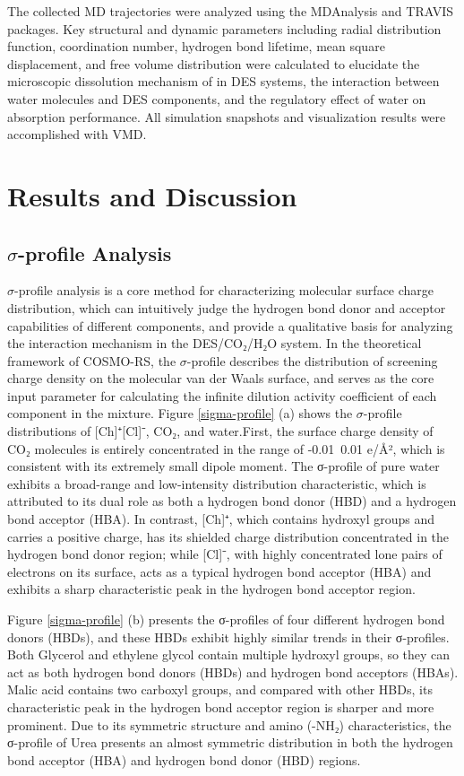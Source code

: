 \documentclass[AMA,LATO2COL]{WileyNJDv5} %
\begin{document}
The collected MD trajectories were analyzed using the MDAnalysis and TRAVIS packages. Key structural and dynamic parameters including radial distribution function, coordination number, hydrogen bond lifetime, mean square displacement, and free volume distribution were calculated to elucidate the microscopic dissolution mechanism of  in DES systems, the interaction between water molecules and DES components, and the regulatory effect of water on  absorption performance. All simulation snapshots and visualization results were accomplished with VMD.

\section{Results and Discussion}

\subsection{$\sigma$-profile Analysis}

$\sigma$-profile analysis is a core method for characterizing molecular surface charge distribution, which can intuitively judge the hydrogen bond donor and acceptor capabilities of different components, and provide a qualitative basis for analyzing the interaction mechanism in the DES/CO₂/H₂O system. In the theoretical framework of COSMO-RS, the $\sigma$-profile describes the distribution of screening charge density on the molecular van der Waals surface, and serves as the core input parameter for calculating the infinite dilution activity coefficient of each component in the mixture. Figure \ref{sigma-profile} (a) shows the $\sigma$-profile distributions of [Ch]⁺[Cl]⁻, CO₂, and water.First, the surface charge density of CO₂ molecules is entirely concentrated in the range of -0.01~0.01 e/Å², which is consistent with its extremely small dipole moment. The σ-profile of pure water exhibits a broad-range and low-intensity distribution characteristic, which is attributed to its dual role as both a hydrogen bond donor (HBD) and a hydrogen bond acceptor (HBA). In contrast, [Ch]⁺, which contains hydroxyl groups and carries a positive charge, has its shielded charge distribution concentrated in the hydrogen bond donor region; while [Cl]⁻, with highly concentrated lone pairs of electrons on its surface, acts as a typical hydrogen bond acceptor (HBA) and exhibits a sharp characteristic peak in the hydrogen bond acceptor region.

Figure \ref{sigma-profile} (b) presents the σ-profiles of four different hydrogen bond donors (HBDs), and these HBDs exhibit highly similar trends in their σ-profiles. Both Glycerol and ethylene glycol contain multiple hydroxyl groups, so they can act as both hydrogen bond donors (HBDs) and hydrogen bond acceptors (HBAs). Malic acid contains two carboxyl groups, and compared with other HBDs, its characteristic peak in the hydrogen bond acceptor region is sharper and more prominent. Due to its symmetric structure and amino (-NH₂) characteristics, the σ-profile of Urea presents an almost symmetric distribution in both the hydrogen bond acceptor (HBA) and hydrogen bond donor (HBD) regions.
\end{document}
